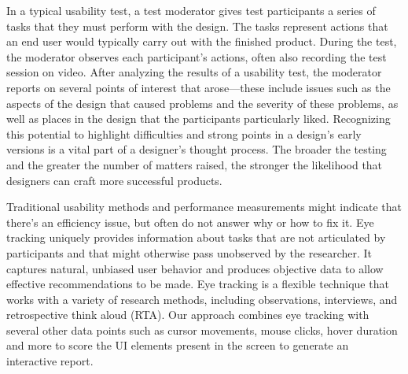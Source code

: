 \documentclass[hidelinks,12pt,a4paper,final]{extreport}
\begin{document}
In a typical usability test, a test moderator gives test participants a series of tasks that they must perform with the design. The tasks represent actions that an end user would typically carry out with the finished product. During the test, the moderator observes each participant’s actions, often also recording the test session on video. After analyzing the results of a usability test, the moderator reports on several points of interest that arose—these include issues such as the aspects of the design that caused problems and the severity of these problems, as well as places in the design that the participants particularly liked. Recognizing this potential to highlight difficulties and strong points in a design’s early versions is a vital part of a designer’s thought process. The broader the testing and the greater the number of matters raised, the stronger the likelihood that designers can craft more successful products. 

Traditional usability methods and performance measurements might indicate that there’s an efficiency issue, but often do not answer why or how to fix it. Eye tracking uniquely provides information about tasks that are not articulated by participants and that might otherwise pass unobserved by the researcher. It captures natural, unbiased user behavior and produces objective data to allow effective recommendations to be made. Eye tracking is a flexible technique that
works with a variety of research methods, including observations, interviews, and retrospective think aloud (RTA). Our approach combines eye tracking with several other data points such as cursor movements, mouse clicks, hover duration and more to score the UI elements present in the screen to generate an interactive report.


\vspace{0.5cm}
\newpage
\end{document}
